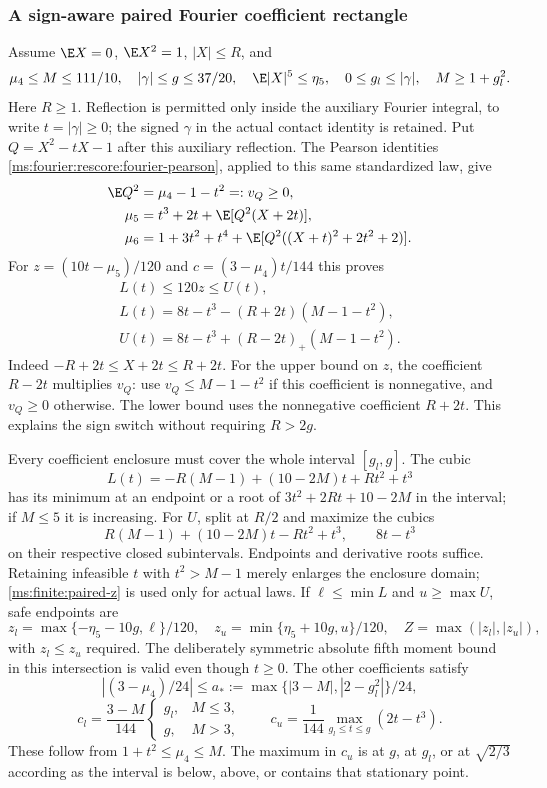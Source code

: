 \subsubsection{A sign-aware paired Fourier coefficient rectangle}
\label{ms:finite:paired-rectangle}
Assume $\E X=0$, $\E X^2=1$, $|X|\le R$, and
\[
 \mu_4\le M\le111/10,\quad |\gamma|\le g\le37/20,
 \quad \E|X|^5\le\eta_5,\quad
 0\le g_l\le|\gamma|,\quad M\ge1+g_l^2.
\]
Here $R\ge1$. Reflection is permitted only inside the auxiliary Fourier
integral, to write $t=|\gamma|\ge0$; the signed $\gamma$ in the actual
contact identity is retained. Put $Q=X^2-tX-1$ after this auxiliary
reflection. The Pearson identities
\eqref{ms:fourier:rescore:fourier-pearson}, applied to this same
standardized law, give
\begin{align}
 \E Q^2&=\mu_4-1-t^2=:v_Q\ge0,\notag\\
 \mu_5&=t^3+2t+\E[Q^2(X+2t)],\notag\\
 \mu_6&=1+3t^2+t^4+
   \E[Q^2((X+t)^2+2t^2+2)].
 \label{ms:finite:pearson-identities}
\end{align}
For $z=(10t-\mu_5)/120$ and $c=(3-\mu_4)t/144$ this proves
\begin{equation}
 \begin{gathered}
 L(t)\le120z\le U(t),\\
 L(t)=8t-t^3-(R+2t)(M-1-t^2),\\
 U(t)=8t-t^3+(R-2t)_+(M-1-t^2).
 \end{gathered}
 \label{ms:finite:paired-z}
\end{equation}
Indeed $-R+2t\le X+2t\le R+2t$. For the upper bound on $z$, the
coefficient $R-2t$ multiplies $v_Q$: use $v_Q\le M-1-t^2$ if this
coefficient is nonnegative, and $v_Q\ge0$ otherwise. The lower bound
uses the nonnegative coefficient $R+2t$. This explains the sign switch
without requiring $R>2g$.

Every coefficient enclosure must cover the whole interval $[g_l,g]$.
The cubic
\[
 L(t)=-R(M-1)+(10-2M)t+Rt^2+t^3
\]
has its minimum at an endpoint or a root of
$3t^2+2Rt+10-2M$ in the interval; if $M\le5$ it is increasing.
For $U$, split at $R/2$ and maximize the cubics
\[
 R(M-1)+(10-2M)t-Rt^2+t^3,\qquad 8t-t^3
\]
on their respective closed subintervals. Endpoints and derivative roots
suffice. Retaining infeasible $t$ with $t^2>M-1$ merely enlarges the
enclosure domain; \eqref{ms:finite:paired-z} is used only for actual laws.
If $\ell\le\min L$ and $u\ge\max U$, safe endpoints are
\[
 z_l=\max\{-\eta_5-10g,\ell\}/120,\quad
 z_u=\min\{\eta_5+10g,u\}/120,\quad
 Z=\max(|z_l|,|z_u|),
\]
with $z_l\le z_u$ required. The deliberately symmetric absolute fifth
moment bound in this intersection is valid even though $t\ge0$.
The other coefficients satisfy
\[
 |(3-\mu_4)/24|\le a_*:=\max\{|3-M|,|2-g_l^2|\}/24,
\]
\[
 c_l=\frac{3-M}{144}
 \begin{cases}g_l,&M\le3,\\g,&M>3,\end{cases}
 \qquad c_u=\frac1{144}\max_{g_l\le t\le g}(2t-t^3).
\]
These follow from $1+t^2\le\mu_4\le M$. The maximum in $c_u$ is
at $g$, at $g_l$, or at $\sqrt{2/3}$ according as the interval is
below, above, or contains that stationary point.

